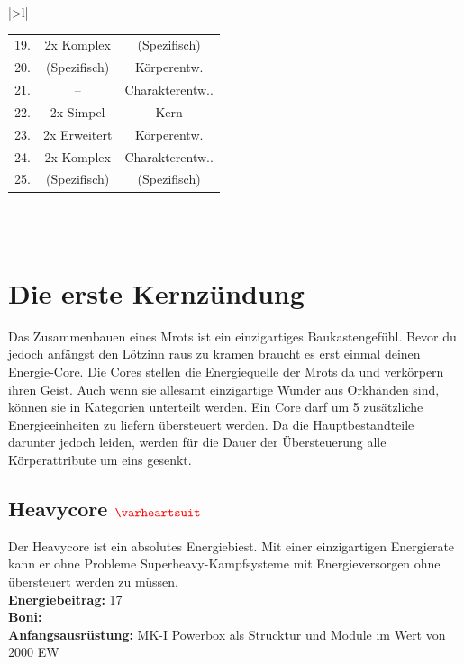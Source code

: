 \begin{table}[h!]
\begin{tabular}{|>{}l|}
\begin{tabular}{c|c|c}
            \rowcolor{myred} 19. & 2x Komplex & (Spezifisch)\\
            \rowcolor{mysilver} 20. & (Spezifisch) & Körperentw.\\
            \rowcolor{myred} 21. & -- & Charakterentw..\\
            \rowcolor{mysilver} 22. & 2x Simpel & Kern\\
            \rowcolor{myred} 23. & 2x Erweitert & Körperentw.\\
            \rowcolor{mysilver} 24. & 2x Komplex & Charakterentw..\\
            \rowcolor{myred} 25. & (Spezifisch) & (Spezifisch) \\
        \end{tabular}\\
        \\
        \btrule{1pt}
    \end{tabular}
\end{table}


\section*{Die erste Kernzündung}
Das Zusammenbauen eines Mrots ist ein einzigartiges Baukastengefühl. Bevor du jedoch anfängst den Lötzinn raus zu kramen braucht es erst einmal deinen Energie-Core. Die Cores stellen die Energiequelle der Mrots da und verkörpern ihren Geist. Auch wenn sie allesamt einzigartige Wunder aus Orkhänden sind, können sie in Kategorien unterteilt werden. Ein Core darf um 5 zusätzliche Energieeinheiten zu liefern übersteuert werden. Da die Hauptbestandteile darunter jedoch leiden, werden für die Dauer der Übersteuerung alle Körperattribute um eins gesenkt.

\subsection*{Heavycore $\Herz{}$}
Der Heavycore ist ein absolutes Energiebiest. Mit einer einzigartigen Energierate kann er ohne Probleme Superheavy-Kampfsysteme mit Energieversorgen ohne übersteuert werden zu müssen.\\
\textbf{Energiebeitrag:} 17 \\
\textbf{Boni:} \\
\textbf{Anfangsausrüstung:} MK-I Powerbox als Strucktur und Module im Wert von 2000 EW \\

